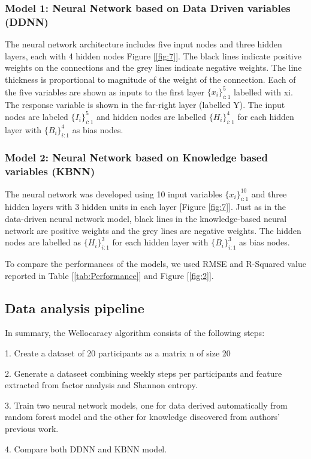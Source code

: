 \documentclass[preprint,12pt]{elsarticle}
\begin{document}
\subsubsection{Model 1: Neural Network based on Data Driven variables (DDNN)}
The neural network architecture includes five input nodes and three hidden layers, each with 4 hidden nodes Figure [\ref{fig:7}]. The black lines indicate positive weights on the connections and the grey lines indicate negative weights. The line thickness is proportional to magnitude of the weight of the connection. Each of the five variables are shown as inputs to the first layer  $\{x_i\}^{5} _{i:1}$ labelled with xi. The response variable is shown in the far-right layer (labelled Y). The input nodes are labeled $\{I_i\}^{5} _{i:1}$ and hidden nodes are labelled $\{H_i\}^{4} _{i:1}$ for each hidden layer with $\{B_i\}^{4} _{i:1}$ as bias nodes. 
\subsubsection{Model 2: Neural Network based on Knowledge based variables (KBNN)}
The neural network was developed using 10 input variables $\{x_i\}^{10} _{i:1}$ and three hidden layers with 3 hidden units in each layer [Figure \ref{fig:7}]. Just as in the data-driven neural network model, black lines in the knowledge-based neural network are positive weights and the grey lines are negative weights. The hidden nodes are labelled as $\{H_i\}^{3} _{i:1}$ for each hidden layer with $\{B_i\}^{3} _{i:1}$ as bias nodes.

To compare the performances of the models, we used RMSE and R-Squared value reported in Table [\ref{tab:Performance}] and Figure [\ref{fig:2}].

\subsection{Data analysis pipeline}
In summary, the Wellocaracy algorithm consists of the following steps:

1. Create a dataset of 20 participants as a matrix n of size 20

2. Generate a dataseet combining weekly steps per participants and feature extracted from factor analysis and Shannon entropy.

3. Train two neural network models, one for data derived automatically from random forest model and the other for knowledge discovered from authors' previous work.

4. Compare both DDNN and KBNN model. 
\end{document}
